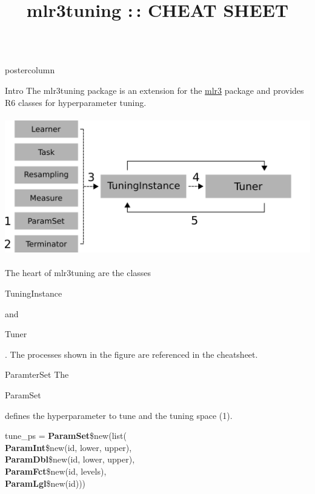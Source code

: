 \documentclass{beamer}
\title{mlr3tuning :\,: CHEAT SHEET} %
\newlength{\columnheight} %
\newcommand{\codeinline}[1]{\begin{codeboxinline}#1\end{codeboxinline}}
\begin{document}
\begin{frame}[fragile]{}
	\begin{columns}
		\begin{column}{.245\textwidth}
			\begin{beamercolorbox}[center]{postercolumn}
				\begin{minipage}{.98\textwidth}
					\parbox[t][\columnheight]{\textwidth}{
						\begin{myblock}{Intro}
							The mlr3tuning package is an extension for the \href{https://github.com/mlr-org/mlr3}{mlr3} package and provides R6 classes for hyperparameter tuning.
							\\
							\\
							\includegraphics[width=\textwidth]{img/tuning_objects.png}
							\\
							\\
							The heart of mlr3tuning are the classes \codeinline{TuningInstance} and \codeinline{Tuner}. The processes shown in the figure are referenced in the cheatsheet. 
						\end{myblock}
						\begin{myblock}{ParamterSet}
							The \codeinline{ParamSet} defines the hyperparameter to tune and the tuning space (1).
							\\
							\begin{codeboxmultiline}[width=21cm]
								tune\_ps = \textbf{ParamSet}\$new(list(\\
								\hspace*{1ex}\textbf{ParamInt}\$new(id, lower, upper),\\
								\hspace*{1ex}\textbf{ParamDbl}\$new(id, lower, upper),\\
								\hspace*{1ex}\textbf{ParamFct}\$new(id, levels),\\
								\hspace*{1ex}\textbf{ParamLgl}\$new(id)))

\end{codeboxmultiline}
\end{myblock}}
\end{minipage}
\end{beamercolorbox}
\end{column}
\end{columns}
\end{frame}
\end{document}
